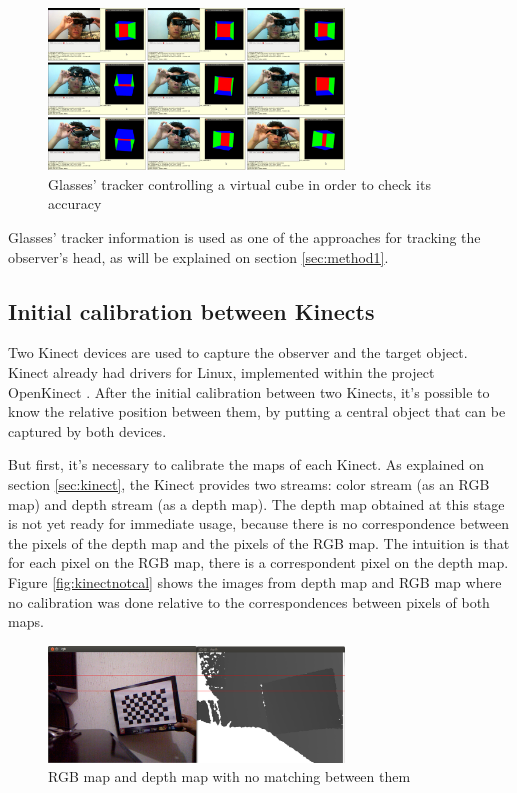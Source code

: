 \documentclass[msc, a4paper, classic, en]{ufbathesis}
\begin{document}
\begin{figure}
\centering
\includegraphics[width=0.7\textwidth]{images/glassescube.png}
\caption{Glasses' tracker controlling a virtual cube in order to check its accuracy}
\label{fig:glassescube}
\end{figure}

Glasses' tracker information is used as one of the approaches for tracking the observer's head, as will be explained on section \ref{sec:method1}.

\subsection{Initial calibration between Kinects}
\label{sec:kinectscalib}

Two Kinect devices are used to capture the observer and the target object. Kinect already had drivers for Linux, implemented within the project OpenKinect \cite{openkinect}. After the initial calibration between two Kinects, it's possible to know the relative position between them, by putting a central object that can be captured by both devices.

But first, it's necessary to calibrate the maps of each Kinect. As explained on section \ref{sec:kinect}, the Kinect provides two streams: color stream (as an RGB map) and depth stream (as a depth map). The depth map obtained at this stage is not yet ready for immediate usage, because there is no correspondence between the pixels of the depth map and the pixels of the RGB map. The intuition is that for each pixel on the RGB map, there is a correspondent pixel on the depth map. Figure \ref{fig:kinectnotcal} shows the images from depth map and RGB map where no calibration was done relative to the correspondences between pixels of both maps.

\begin{figure}
\centering
\includegraphics[width=0.7\textwidth]{images/kinectnocal.png}
\caption{RGB map and depth map with no matching between them}
\label{fig:kinectnocal}
\end{figure}
\end{document}
